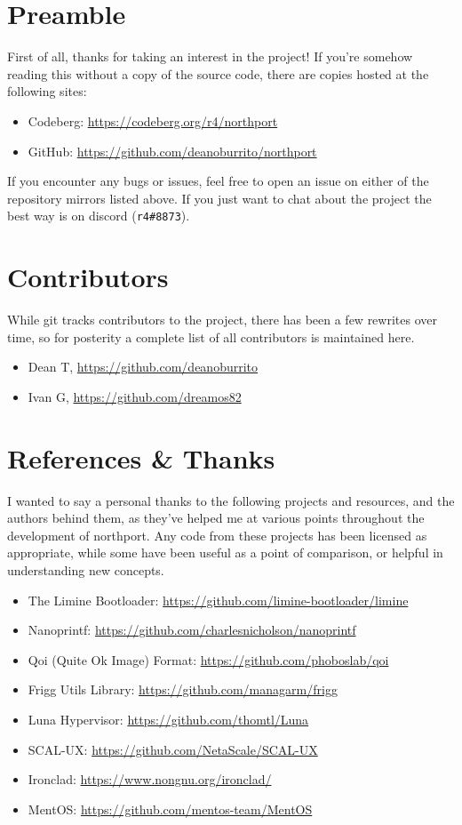 \section{Preamble}
First of all, thanks for taking an interest in the project! If you're somehow reading this without a copy of the source code, there are copies hosted at the following sites:

\begin{itemize}
    \item Codeberg: \url{https://codeberg.org/r4/northport}
    \item GitHub: \url{https://github.com/deanoburrito/northport}
\end{itemize}

If you encounter any bugs or issues, feel free to open an issue on either of the repository mirrors listed above. If you just want to chat about the project the best way is on discord (\verb|r4#8873|).

\section{Contributors}
While git tracks contributors to the project, there has been a few rewrites over time, so for posterity a complete list of all contributors is maintained here. 

\begin{itemize}
    \item Dean T, \url{https://github.com/deanoburrito}
    \item Ivan G, \url{https://github.com/dreamos82}
\end{itemize}

\section{References \& Thanks}
I wanted to say a personal thanks to the following projects and resources, and the authors behind them, as they've helped me at various points throughout the development of northport. Any code from these projects has been licensed as appropriate, while some have been useful as a point of comparison, or helpful in understanding new concepts.

\begin{itemize}
    \item The Limine Bootloader: \url{https://github.com/limine-bootloader/limine}
    \item Nanoprintf: \url{https://github.com/charlesnicholson/nanoprintf}
    \item Qoi (Quite Ok Image) Format: \url{https://github.com/phoboslab/qoi}
    \item Frigg Utils Library: \url{https://github.com/managarm/frigg}
    \item Luna Hypervisor: \url{https://github.com/thomtl/Luna}
    \item SCAL-UX: \url{https://github.com/NetaScale/SCAL-UX}
    \item Ironclad: \url{https://www.nongnu.org/ironclad/}
    \item MentOS: \url{https://github.com/mentos-team/MentOS}
\end{itemize}

